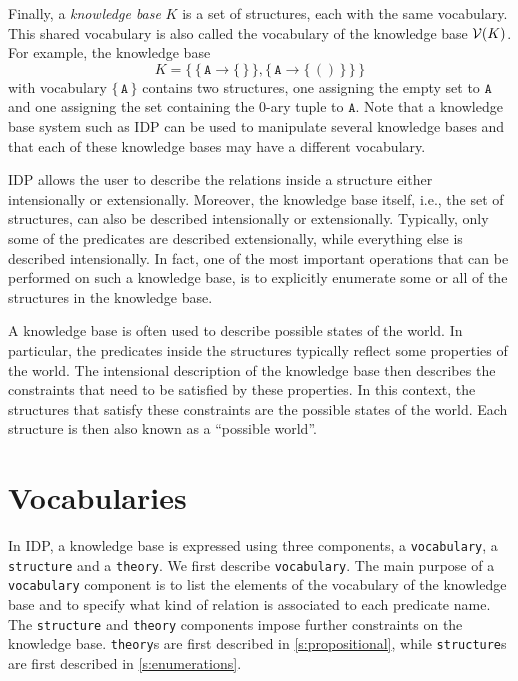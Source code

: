 \documentclass{article}
\newcommand{\idp}{{\sc IDP}\xspace}
\newcommand{\voc}[1]{{\cal V}(#1)}
\begin{document}
Finally, a \emph{knowledge base} $K$ is a set of structures, each
with the same vocabulary.  This shared vocabulary is also called
the vocabulary of the knowledge base $\voc{K}$.
For example, the knowledge base
$$
K = \{\,
\{\, \mathtt{A} \to \{\, \} \,\},
\{\, \mathtt{A} \to \{\, () \,\} \,\}
\,\}
$$
with vocabulary $\{\, \mathtt{A} \,\}$ contains two structures,
one assigning the empty set to $\mathtt{A}$ and
one assigning the set containing the $0$-ary tuple to $\mathtt{A}$.
Note that a knowledge base system such as \idp can be used
to manipulate several knowledge bases and that each of these
knowledge bases may have a different vocabulary.

\idp allows the user to describe the relations inside a structure
either intensionally or extensionally.
Moreover, the knowledge base itself, i.e., the set of structures,
can also be described intensionally or extensionally.
Typically, only some of the
predicates are described extensionally, while everything else
is described intensionally.
In fact, one of the most important operations that can be performed
on such a knowledge base, is to explicitly enumerate some or all of the
structures in the knowledge base.

A knowledge base is often used to describe possible states of the world.
In particular, the predicates inside the structures typically reflect
some properties of the world.  The intensional description of
the knowledge base then describes the constraints that need to
be satisfied by these properties.  In this context, the structures that satisfy
these constraints are the possible states of the world.
Each structure is then also known as a ``possible world''.

\section{Vocabularies}

In \idp, a knowledge base is expressed using three components,
a \texttt{vocabulary}, a \texttt{structure} and a \texttt{theory}.
We first describe \texttt{vocabulary}.
The main purpose of a \texttt{vocabulary} component is to list
the elements of the vocabulary of the knowledge base and to specify
what kind of relation is associated to each predicate name.
The \texttt{structure} and \texttt{theory} components impose
further constraints on the knowledge base.
\texttt{theory}s are first described in \autoref{s:propositional},
while \texttt{structure}s are first described in \autoref{s:enumerations}.
\end{document}

